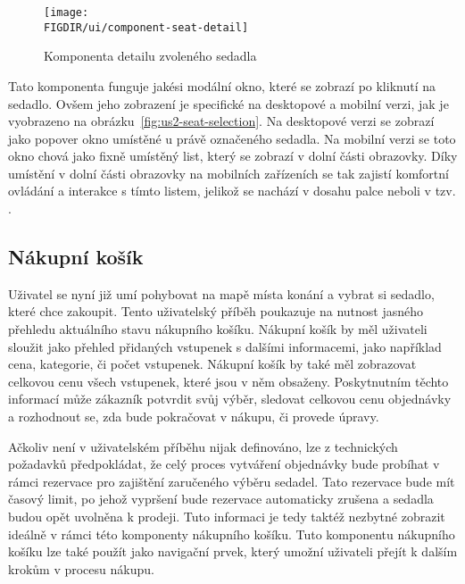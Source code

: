 \begin{figure}[H]
    \centering
    \texttt{[image: \\FIGDIR/ui/component-seat-detail]}
    \caption{Komponenta detailu zvoleného sedadla}
    \label{fig:component-seat-}
\end{figure}

Tato komponenta funguje jakési modální okno, které se zobrazí po kliknutí na sedadlo.
Ovšem jeho zobrazení je specifické na desktopové a mobilní verzi, jak je vyobrazeno na obrázku~\ref{fig:us2-seat-selection}.
Na desktopové verzi se zobrazí jako popover okno umístěné u právě označeného sedadla.
Na mobilní verzi se toto okno chová jako fixně umístěný list, který se zobrazí v dolní části obrazovky.
Díky umístění v dolní části obrazovky na mobilních zařízeních se tak zajistí komfortní ovládání a interakce s tímto listem, jelikož se nachází v dosahu palce neboli v tzv. .

\subsection{Nákupní košík}
\label{subsec:narvh-ui-transformace-uzivatelskych-pribehu-nakupni-kosik}
\userstoryshoppingcart

Uživatel se nyní již umí pohybovat na mapě místa konání a vybrat si sedadlo, které chce zakoupit.
Tento uživatelský příběh poukazuje na nutnost jasného přehledu aktuálního stavu nákupního košíku.
Nákupní košík by měl uživateli sloužit jako přehled přidaných vstupenek s dalšími informacemi, jako například cena, kategorie, či počet vstupenek.
Nákupní košík by také měl zobrazovat celkovou cenu všech vstupenek, které jsou v něm obsaženy.
Poskytnutním těchto informací může zákazník potvrdit svůj výběr, sledovat celkovou cenu objednávky a rozhodnout se, zda bude pokračovat v nákupu, či provede úpravy.

Ačkoliv není v uživatelském příběhu nijak definováno, lze z technických požadavků předpokládat, že celý proces vytváření objednávky bude probíhat v rámci rezervace pro zajištění zaručeného výběru sedadel.
Tato rezervace bude mít časový limit, po jehož vypršení bude rezervace automaticky zrušena a sedadla budou opět uvolněna k prodeji.
Tuto informaci je tedy taktéž nezbytné zobrazit ideálně v rámci této komponenty nákupního košíku.
Tuto komponentu nákupního košíku lze také použít jako navigační prvek, který umožní uživateli přejít k dalším krokům v procesu nákupu.

